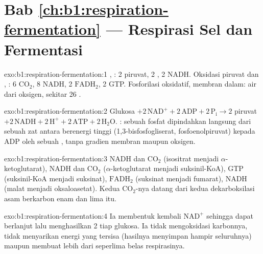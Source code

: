 \section*{Bab \ref{ch:b1:respiration-fermentation} --- Respirasi Sel dan Fermentasi}

\begin{solution}{exo:b1:respiration-fermentation:1}
, : 2 piruvat, 2 , 2 NADH. Oksidasi piruvat dan
, : 6 $\mathrm{CO_2}$, 8 NADH, 2
$\mathrm{FADH_2}$, 2 GTP. Fosforilasi oksidatif, membran dalam: air
dari oksigen, sekitar 26 .
\end{solution}

\begin{solution}{exo:b1:respiration-fermentation:2}
Glukosa $+ 2\,\mathrm{NAD^+} + 2\,\mathrm{ADP} + 2\,\mathrm{P_i} \to
2$ piruvat $+ 2\,\mathrm{NADH} + 2\,\mathrm{H^+} + 2\,\mathrm{ATP} +
2\,\mathrm{H_2O}$. : sebuah fosfat dipindahkan
langsung dari sebuah zat antara berenergi tinggi
(1,3-bisfosfogliserat, fosfoenolpiruvat) kepada ADP oleh sebuah ,
tanpa gradien membran maupun oksigen.
\end{solution}

\begin{solution}{exo:b1:respiration-fermentation:3}
NADH dan $\mathrm{CO_2}$ (isositrat menjadi $\alpha$-ketoglutarat),
NADH dan $\mathrm{CO_2}$ ($\alpha$-ketoglutarat menjadi suksinil-KoA),
GTP (suksinil-KoA menjadi suksinat), $\mathrm{FADH_2}$ (suksinat
menjadi fumarat), NADH (malat menjadi oksaloasetat). Kedua
$\mathrm{CO_2}$-nya datang dari kedua dekarboksilasi asam berkarbon
enam dan lima itu.
\end{solution}

\begin{solution}{exo:b1:respiration-fermentation:4}
Ia membentuk kembali $\mathrm{NAD^+}$ sehingga  dapat
berlanjut lalu menghasilkan 2  tiap glukosa. Ia tidak mengoksidasi
karbonnya, tidak menyarikan energi yang tersisa (hasilnya menyimpan
hampir seluruhnya) maupun membuat lebih dari seperlima belas 
respirasinya.
\end{solution}

